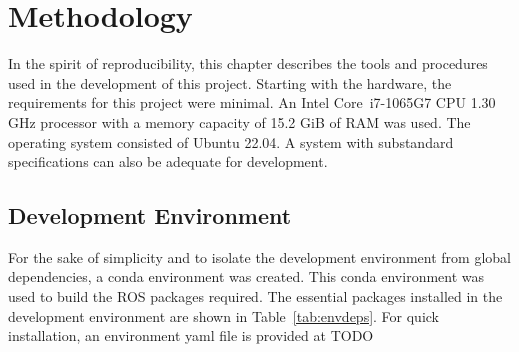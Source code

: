 \chapter{Methodology}\label{cha:methodology}

    In the spirit of reproducibility, this chapter describes the tools and procedures used in the development of this project. Starting with the hardware, the requirements for this project were minimal. An Intel\textsuperscript{\textregistered} Core\texttrademark\ i7-1065G7 CPU 1.30 GHz processor with a memory capacity of 15.2 GiB of RAM was used. The operating system consisted of Ubuntu 22.04. A system with substandard specifications can also be adequate for development.

\section{Development Environment}

    For the sake of simplicity and to isolate the development environment from global dependencies, a \textsf{conda} environment was created. This \textsf{conda} environment was used to build the \ac{ROS} packages required. The essential packages installed in the development environment are shown in Table~\ref{tab:envdeps}. For quick installation, an environment yaml file is provided at TODO

